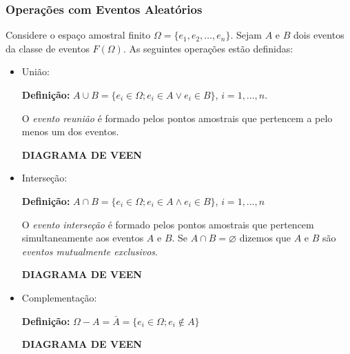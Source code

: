 \documentclass[hyperref={pdfpagelabels=false}]{beamer}
\begin{document}
\begin{frame}
\frametitle{Operações com Eventos Aleatórios}

Considere o espaço amostral finito $\Omega = \{ e_1, e_2, \dots, e_n \}$. Sejam $A$ e $B$ dois eventos da classe de eventos $F(\Omega)$. As seguintes operações  estão definidas:
\pause
\begin{itemize}
	\item União:
	
	{\bf Definição:} $A \cup B = \{ e_i \in \Omega; e_i \in A \lor e_i \in B \}$, $i = 1,\dots,n$.
	
	O {\it evento reunião} é formado pelos pontos amostrais que pertencem a pelo menos um dos eventos.
	
	\begin{center}
		{\bf \tiny DIAGRAMA DE VEEN}
	\end{center}
	\pause
	\item Interseção:
	
	{\bf Definição:} $A \cap B = \{ e_i \in \Omega; e_i \in A \land e_i \in B \}$, $i = 1,\dots,n$
	
	O {\it evento interseção} é formado pelos pontos amostrais que pertencem simultaneamente aos eventos $A$ e $B$. Se $A \cap B = \varnothing$ dizemos que $A$ e $B$ são {\it eventos mutualmente exclusivos}.
	
	\begin{center}
		{\bf \tiny DIAGRAMA DE VEEN}
	\end{center}	
	\pause
	\item Complementação:
	
	{\bf Definição:} $\Omega - A = \bar{A} = \{ e_i \in \Omega; e_i \notin A \}$	
	
	\begin{center}
		{\bf \tiny DIAGRAMA DE VEEN}
	\end{center}
	
\end{itemize}


\end{frame}
\end{document}
